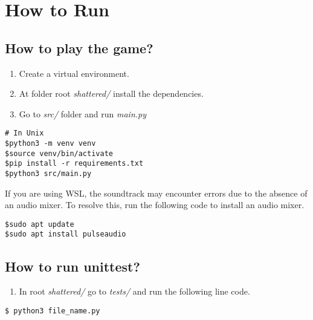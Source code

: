 \section{How to Run}

\subsection{How to play the game?}

\begin{enumerate}[label=\textbullet]
  \item Create a virtual environment.
  

  \item At folder root \textit{shattered/} install the dependencies.

  \item Go to \textit{src/} folder and run \textit{main.py}

\end{enumerate}


  \begin{verbatim}
# In Unix
$python3 -m venv venv
$source venv/bin/activate
$pip install -r requirements.txt 
$python3 src/main.py
\end{verbatim}

If you are using WSL, the soundtrack may encounter errors due to the absence of an audio mixer. To resolve this, run the following code to install an audio mixer.

\begin{verbatim}
$sudo apt update
$sudo apt install pulseaudio
\end{verbatim}

\subsection{How to run unittest?}

\begin{enumerate}[label=\textbullet]
    \item In root \textit{shattered/} go to \textit{tests/} and run the following line code.
    
\end{enumerate}

\begin{verbatim}
$ python3 file_name.py
\end{verbatim}